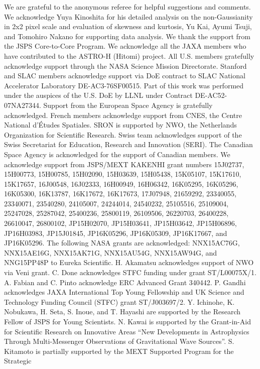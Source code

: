We are grateful to the anonymous referee for helpful suggestions and comments.
%
We acknowledge Yuya Kinoshita for his detailed analysis on the non-Gaussianity in 2x2 pixel scale and evaluation of skewness and kurtosis, Yu Kai, Ayumi Tsuji, and Tomohiro Nakano for supporting data analysis.
%
We thank the support from the JSPS Core-to-Core Program.
%
We acknowledge all the JAXA members who have contributed to the ASTRO-H (Hitomi)
project.
%
All U.S. members gratefully acknowledge support through the NASA Science Mission
Directorate. Stanford and SLAC members acknowledge support via DoE contract to SLAC
National Accelerator Laboratory DE-AC3-76SF00515. Part of this work was performed under
the auspices of the U.S. DoE by LLNL under Contract DE-AC52-07NA27344.
%
Support from the European Space Agency is gratefully acknowledged.
%
French members acknowledge support from CNES, the Centre National d'\'{E}tudes Spatiales.
%
SRON is supported by NWO, the Netherlands Organization for Scientific Research.  Swiss
team acknowledges support of the Swiss Secretariat for Education, Research and
Innovation (SERI).
%
The Canadian Space Agency is acknowledged for the support of Canadian members.  
%
We acknowledge support from JSPS/MEXT KAKENHI grant numbers 15J02737,
15H00773, 15H00785, 15H02090, 15H03639, 15H05438, 15K05107, 15K17610,
15K17657, 16J00548, 16J02333, 16H00949, 16H06342, 16K05295, 16K05296,
16K05300, 16K13787, 16K17672, 16K17673, 17J07948, 21659292, 23340055, 23340071,
23540280, 24105007, 24244014, 24540232, 25105516, 25109004, 25247028,
25287042, 25400236, 25800119, 26109506, 26220703, 26400228, 26610047,
26800102, JP15H02070, JP15H03641, JP15H03642, JP15H06896,
JP16H03983, JP15J01845, JP16K05296, JP16K05309, JP16K17667, and JP16K05296.
%
The following NASA grants are acknowledged: NNX15AC76G, NNX15AE16G, NNX15AK71G,
NNX15AU54G, NNX15AW94G, and NNG15PP48P to Eureka Scientific.
%
H. Akamatsu acknowledges support of NWO via Veni grant.  
%
C. Done acknowledges STFC funding under grant ST/L00075X/1.  
%
A. Fabian and C. Pinto acknowledge ERC Advanced Grant 340442.
%
P. Gandhi acknowledges JAXA International Top Young Fellowship and UK Science and
Technology Funding Council (STFC) grant ST/J003697/2. 
%
Y. Ichinohe, K. Nobukawa, H. Seta, S. Inoue, and T. Hayashi are supported by the Research Fellow of JSPS for Young
Scientists.
%
N. Kawai is supported by the Grant-in-Aid for Scientific Research on Innovative Areas
``New Developments in Astrophysics Through Multi-Messenger Observations of Gravitational
Wave Sources''.
%
S. Kitamoto is partially supported by the MEXT Supported Program for the Strategic
